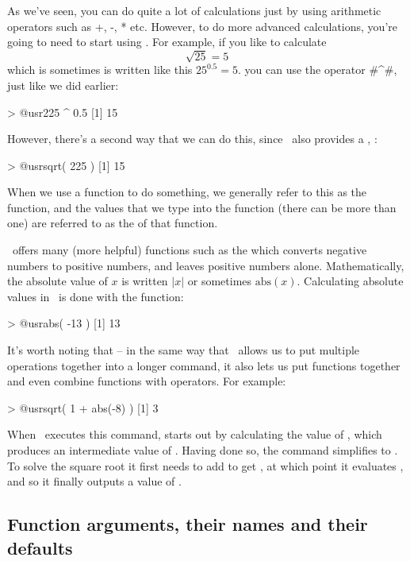 As we've seen, you can do quite a lot of calculations just by using arithmetic operators such as +, -, * etc. However, to do more advanced calculations, you're going to need to start using .
For example, if you like to calculate
$$
\sqrt{25} = 5
$$
which is sometimes is written like this
$
25^{0.5} = 5.
$
you can use the operator \rtextverb#^#, just like we did earlier:
\begin{rblock1}
> @usr{225 ^ 0.5}
[1] 15
\end{rblock1}
However, there's a second way that we can do this, since \R\ also provides a , :
\begin{rblock1}
> @usr{sqrt( 225 )}
[1] 15
\end{rblock1}

When we use a function to do something, we generally refer to this as  the function, and the values that we type into the function (there can be more than one) are referred to as the  of that function. 

\R\ offers many (more helpful) functions such as the  which converts negative numbers to positive numbers, and leaves positive numbers alone. Mathematically, the absolute value of $x$ is written $|x|$ or sometimes $\mbox{abs}(x)$. Calculating absolute values in \R\ is done with the  function:
\begin{rblock1} 
> @usr{abs( -13 )}
[1] 13
\end{rblock1} 


It's worth noting that -- in the same way that \R\ allows us to put multiple operations together into a longer command, it also lets us put functions together and even combine functions with operators. For example:
\begin{rblock1}
> @usr{sqrt( 1 + abs(-8) )}
[1] 3
\end{rblock1}
When \R\ executes this command, starts out by calculating the value of , which produces an intermediate value of . Having done so, the command simplifies to . To solve the square root  it first needs to add  to get , at which point it evaluates , and so it finally outputs a value of .



\subsection{Function arguments, their names and their defaults~\label{sec:functionarguments}}

